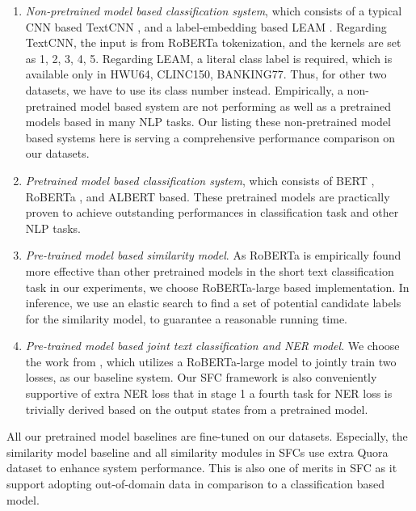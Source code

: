 \begin{enumerate}
  \item   
  \emph{Non-pretrained   model  based  classification  system},  which consists  of  a typical CNN based TextCNN \cite{kim2014convolutional}, and a label-embedding based LEAM \cite{wang2018joint}. 
  Regarding TextCNN, the input is from RoBERTa tokenization, and the kernels are set as 1, 2, 3, 4, 5. 
  Regarding LEAM, a literal class label is required, which is available only in HWU64, CLINC150, BANKING77. 
  Thus, for other two datasets, we have to use its class number instead.  
  Empirically, a  non-pretrained  model  based  system  are  not  performing  as  well as a pretrained  models  based in many NLP tasks.
  Our listing these  non-pretrained model based systems here is serving a comprehensive performance comparison on our datasets.

  \item 
  \emph{Pretrained model based classification system}, which consists of BERT \cite{devlin2018bert},  RoBERTa \cite{liu2019roberta},  and  ALBERT  \cite{lan2019albert}  based.  
  These pretrained models  are  practically  proven  to  achieve  outstanding  performances  in classification task and other NLP tasks.

  \item   
  \emph{Pre-trained   model   based   similarity   model}.  
  As RoBERTa is empirically found more effective than other pretrained models  in  the  short  text  classification  task  in  our  experiments, we  choose RoBERTa-large  based implementation.
  In inference,  we  use  an  elastic search to find a set of potential candidate labels for the similarity model, to guarantee a reasonable running time.
  
  \item 
  \emph{Pre-trained model based joint text classification and NER model}. 
  We choose the work from \cite{chen2019bert}, which utilizes a RoBERTa-large model to jointly train two losses, as our baseline system.
  Our  SFC framework  is also conveniently supportive of extra NER loss that in  stage  1 a fourth task for NER loss is trivially derived  based on the  output states from a pretrained model.

\end{enumerate}

All our pretrained model   baselines  are  fine-tuned  on  our datasets.
Especially, the similarity  model  baseline  and all similarity modules in SFCs use extra Quora  dataset  \cite{iyer2017first}  to enhance system performance. 
This is also one of merits in SFC as it support adopting out-of-domain data in comparison to a classification based model.

